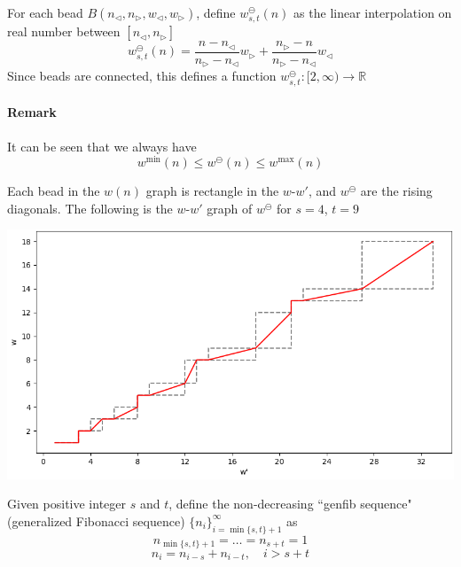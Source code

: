 \documentclass[]{article}
\begin{document}
\vspace{1cm}
\begin{definition}[Middle]
	For each bead $	B(n_{\triangleleft}, n_{\triangleright}, w_{\triangleleft}, w_{\triangleright})$, define $w^{\ominus}_{s,t}(n)$ as the linear interpolation on real number between $[n_{\triangleleft}, n_{\triangleright}]$
	\[
		w^{\ominus}_{s,t}(n) = \frac{n - n_{\triangleleft}}{n_{\triangleright} - n_{\triangleleft}} w_{\triangleright} + \frac{n_{\triangleright} - n}{n_{\triangleright} - n_{\triangleleft}}w_{\triangleleft}
	\]
	Since beads are connected, this defines a function $w_{s,t}^{\ominus}: [2, \infty)\to\mathbb{R}$
\end{definition}

\paragraph{Remark}
It can be seen that we always have
\[
w^{\min}(n)\le w^{\ominus}(n)\le w^{\max}(n)
\]

Each bead in the $w(n)$ graph is rectangle in the $w$-$w'$, and $w^{\ominus}$ are the rising diagonals. The following is the $w$-$w'$ graph of $w^{\ominus}$ for $s=4$, $t=9$

\includegraphics[scale=0.7]{w-n-v.png}

\vspace{1cm}
\begin{definition}[Fibonacci]
	Given positive integer $s$ and $t$, define the non-decreasing ``genfib sequence" (generalized Fibonacci sequence) $\{n_i\}_{i=\min\{s,t\}+1}^\infty$ as
	\[
	n_{\min\{s,t\}+1} = \dots = n_{s + t} = 1
	\]
	\[
	n_{i} = n_{i - s} + n_{i - t} , \quad i > s + t
	\]
\end{definition}
\end{document}
